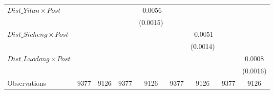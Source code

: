 {\begin{tabular}{l*{8}{c}}
\addlinespace
$ Dist\_Yilan \times Post$&                  &                  &                  &  -0.0056\sym{***}&                  &                  &                  &                  \\
                &                  &                  &                  & (0.0015)         &                  &                  &                  &                  \\
\addlinespace
$ Dist\_Sicheng \times Post$&                  &                  &                  &                  &                  &  -0.0051\sym{***}&                  &                  \\
                &                  &                  &                  &                  &                  & (0.0014)         &                  &                  \\
\addlinespace
$ Dist\_Luodong \times Post$&                  &                  &                  &                  &                  &                  &                  &   0.0008         \\
                &                  &                  &                  &                  &                  &                  &                  & (0.0016)         \\
\midrule
Observations    &     9377         &     9126         &     9377         &     9126         &     9377         &     9126         &     9377         &     9126         \\
\bottomrule
\end{tabular}
}
